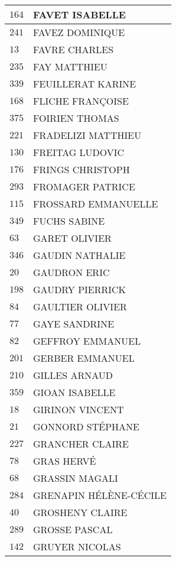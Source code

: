 \begin{xltabular}{\linewidth}{|l|X|}
    \hline
    $164$ & FAVET ISABELLE \\
    \hline
    $241$ & FAVEZ DOMINIQUE \\
    \hline
    $13$ & FAVRE CHARLES \\
    \hline
    $235$ & FAY MATTHIEU \\
    \hline
    $339$ & FEUILLERAT KARINE \\
    \hline
    $168$ & FLICHE FRANÇOISE \\
    \hline
    $375$ & FOIRIEN THOMAS \\
    \hline
    $221$ & FRADELIZI MATTHIEU \\
    \hline
    $130$ & FREITAG LUDOVIC \\
    \hline
    $176$ & FRINGS CHRISTOPH \\
    \hline
    $293$ & FROMAGER PATRICE \\
    \hline
    $115$ & FROSSARD EMMANUELLE \\
    \hline
    $349$ & FUCHS SABINE \\
    \hline
    $63$ & GARET OLIVIER \\
    \hline
    $346$ & GAUDIN NATHALIE \\
    \hline
    $20$ & GAUDRON ERIC \\
    \hline
    $198$ & GAUDRY PIERRICK \\
    \hline
    $84$ & GAULTIER OLIVIER \\
    \hline
    $77$ & GAYE SANDRINE \\
    \hline
    $82$ & GEFFROY EMMANUEL \\
    \hline
    $201$ & GERBER EMMANUEL \\
    \hline
    $210$ & GILLES ARNAUD \\
    \hline
    $359$ & GIOAN ISABELLE \\
    \hline
    $18$ & GIRINON VINCENT \\
    \hline
    $21$ & GONNORD STÉPHANE \\
    \hline
    $227$ & GRANCHER CLAIRE \\
    \hline
    $78$ & GRAS HERVÉ \\
    \hline
    $68$ & GRASSIN MAGALI \\
    \hline
    $284$ & GRENAPIN HÉLÈNE-CÉCILE \\
    \hline
    $40$ & GROSHENY CLAIRE \\
    \hline
    $289$ & GROSSE PASCAL \\
    \hline
    $142$ & GRUYER NICOLAS \\

\end{xltabular}
